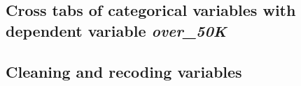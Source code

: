 \documentclass[]{article}
\newenvironment{Shaded}{\begin{snugshade}}{\end{snugshade}}
\newcommand{\DataTypeTok}[1]{\textcolor[rgb]{0.13,0.29,0.53}{#1}}
\newcommand{\KeywordTok}[1]{\textcolor[rgb]{0.13,0.29,0.53}{\textbf{#1}}}
\newcommand{\NormalTok}[1]{#1}
\newcommand{\OperatorTok}[1]{\textcolor[rgb]{0.81,0.36,0.00}{\textbf{#1}}}
\newcommand{\StringTok}[1]{\textcolor[rgb]{0.31,0.60,0.02}{#1}}
\begin{document}
\hypertarget{cross-tabs-of-categorical-variables-with-dependent-variable-over_50k}{%
\subsection{\texorpdfstring{Cross tabs of categorical variables with
dependent variable
\emph{over\_50K}}{Cross tabs of categorical variables with dependent variable over\_50K}}\label{cross-tabs-of-categorical-variables-with-dependent-variable-over_50k}}

\begin{Shaded}
\end{Shaded}

\hypertarget{cleaning-and-recoding-variables}{%
\subsection{Cleaning and recoding
variables}\label{cleaning-and-recoding-variables}}
\end{document}
